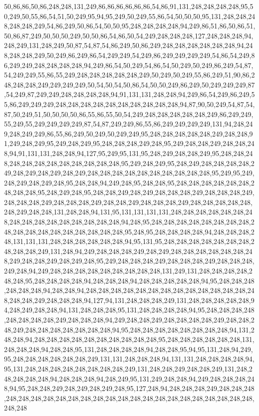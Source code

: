 50,86,86,50,86,248,248,131,249,86,86,86,86,86,86,54,86,91,131,248,248,248,248,95,50,249,50,55,86,54,51,50,249,95,94,95,249,50,249,55,86,54,50,50,50,95,131,248,248,248,248,248,249,54,86,249,50,86,54,50,50,95,248,248,248,248,94,249,86,51,86,50,86,51,50,86,87,249,50,50,50,249,50,50,86,54,86,50,54,249,248,248,248,127,248,248,248,94,248,249,131,248,249,50,87,54,87,54,86,249,50,86,249,248,248,248,248,248,248,94,248,248,248,249,50,249,86,249,86,54,249,249,54,249,86,249,249,249,249,54,86,54,249,86,249,249,248,248,248,248,94,249,86,54,50,249,54,86,54,50,249,50,249,86,249,54,87,54,249,249,55,86,55,249,248,248,248,248,248,249,50,249,50,249,55,86,249,51,90,86,248,248,248,249,249,249,249,50,54,50,54,50,86,54,50,50,249,86,249,50,249,249,249,87,54,249,87,249,249,248,248,248,248,94,91,131,131,248,248,94,249,86,54,249,86,249,55,86,249,249,249,248,248,248,248,248,248,248,248,248,248,94,87,90,50,249,54,87,54,87,50,249,51,50,50,50,50,86,55,86,55,50,54,249,248,248,248,248,248,249,86,249,249,55,249,55,249,249,249,249,87,54,87,249,249,86,55,86,249,249,249,249,131,94,248,249,248,249,249,86,55,86,249,50,249,50,249,249,95,248,248,248,248,248,249,248,248,91,249,248,249,95,249,248,249,95,248,248,248,249,248,95,249,248,248,249,248,248,248,94,91,131,131,248,248,94,127,95,249,95,131,95,248,249,248,248,249,95,248,248,248,248,248,248,248,248,248,248,248,248,95,249,248,249,95,248,249,248,248,248,248,249,248,249,248,249,248,249,248,248,248,248,248,248,248,248,248,248,95,249,95,249,248,249,248,249,248,95,248,248,94,249,248,95,248,248,95,248,248,248,248,248,248,248,248,248,95,248,249,248,95,248,248,249,248,249,248,248,248,249,248,248,248,249,248,248,248,249,248,248,248,249,248,248,249,248,248,248,249,248,248,248,248,248,248,249,248,248,131,248,248,94,131,95,131,131,131,131,248,248,248,248,248,248,248,248,248,248,248,248,248,248,248,248,94,248,95,248,248,248,248,248,248,248,248,248,248,248,248,248,248,248,248,248,248,95,248,95,248,248,248,248,94,248,248,248,248,131,131,131,248,248,248,248,248,248,94,95,131,95,248,248,248,248,248,248,248,248,248,248,249,131,248,94,249,248,248,248,249,248,249,248,248,248,248,248,248,248,249,248,248,249,248,249,248,95,249,248,248,248,249,248,248,248,249,248,248,248,249,248,94,249,248,248,248,248,248,248,248,248,248,131,249,131,248,248,248,248,248,248,95,248,248,248,248,94,248,248,248,94,248,248,248,248,248,94,95,248,248,248,248,248,248,94,248,248,94,248,248,248,248,248,248,248,248,248,248,248,248,248,248,248,248,249,248,248,248,94,127,94,131,248,248,248,249,131,248,248,248,248,248,94,248,249,248,248,94,131,248,248,248,95,131,248,248,248,248,94,95,248,248,248,248,248,248,248,248,249,248,248,248,94,249,248,248,249,248,248,248,248,249,248,248,248,249,248,248,248,248,248,248,248,94,95,248,248,248,248,248,248,248,248,94,131,248,248,94,248,248,248,248,248,248,248,248,248,248,95,248,248,248,248,248,248,131,248,248,248,94,248,248,95,131,248,248,248,248,94,248,248,95,94,95,131,248,94,249,95,248,248,248,248,248,248,249,131,131,248,248,248,94,131,131,248,248,248,248,94,95,131,248,248,248,248,248,248,248,248,249,131,248,248,249,248,248,249,131,248,248,248,248,248,94,248,248,248,94,248,249,95,131,249,248,248,94,249,248,248,248,248,94,95,248,248,249,248,249,248,249,248,95,127,248,94,248,248,248,249,248,248,248,248,248,248,248,248,248,248,248,248,248,248,248,248,248,248,248,248,248,248,248,248,248